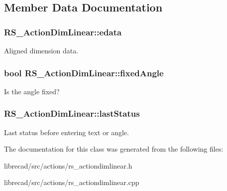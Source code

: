 \subsection{Member Data Documentation}
\hypertarget{classRS__ActionDimLinear_aa4f47d77d19f888e92b7a5d236a00e72}{
\subsubsection[{edata}]{ R\-S\-\_\-\-Action\-Dim\-Linear\-::edata\hspace{0.3cm}{\ttfamily [protected]}}}\label{classRS__ActionDimLinear_aa4f47d77d19f888e92b7a5d236a00e72}
Aligned dimension data. \hypertarget{classRS__ActionDimLinear_aefb615e1a23d3fde4d44ce9b7232d2e5}{
\subsubsection[{fixed\-Angle}]{\setlength{\rightskip}{0pt plus 5cm}bool R\-S\-\_\-\-Action\-Dim\-Linear\-::fixed\-Angle\hspace{0.3cm}{\ttfamily [protected]}}}\label{classRS__ActionDimLinear_aefb615e1a23d3fde4d44ce9b7232d2e5}
Is the angle fixed? \hypertarget{classRS__ActionDimLinear_ad0b972a529601f4ab3a0f5fa6a4729dc}{
\subsubsection[{last\-Status}]{ R\-S\-\_\-\-Action\-Dim\-Linear\-::last\-Status\hspace{0.3cm}{\ttfamily [protected]}}}\label{classRS__ActionDimLinear_ad0b972a529601f4ab3a0f5fa6a4729dc}
Last status before entering text or angle. 

The documentation for this class was generated from the following files\-:\begin{DoxyCompactItemize}
\item 
librecad/src/actions/rs\-\_\-actiondimlinear.\-h\item 
librecad/src/actions/rs\-\_\-actiondimlinear.\-cpp\end{DoxyCompactItemize}
